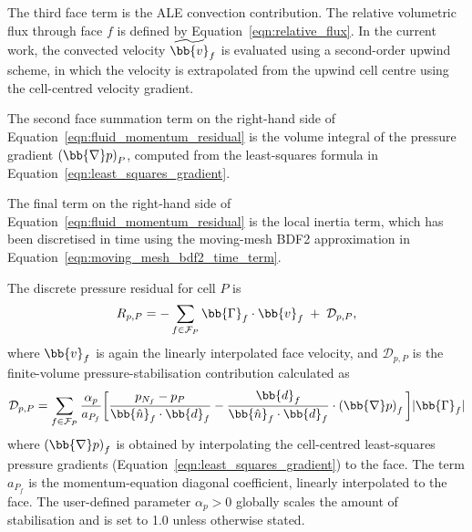 The third face term is the ALE convection contribution. The relative volumetric flux
through face $f$ is defined by Equation~\eqref{eqn:relative_flux}.
In the current work, the convected velocity $\widetilde{\bb{v}}_f$ is evaluated using a second-order upwind scheme, in which the velocity is extrapolated from the upwind cell centre using the cell-centred velocity gradient.

The second face summation term on the right-hand side of Equation~\eqref{eqn:fluid_momentum_residual} is the volume integral of the pressure gradient $\left( \bb{\nabla} p \right)_P$, computed from the least-squares formula in Equation~\eqref{eqn:least_squares_gradient}.

The final term on the right-hand side of Equation~\eqref{eqn:fluid_momentum_residual} is the local inertia term, which has been discretised in time using the moving-mesh BDF2 approximation in Equation~\eqref{eqn:moving_mesh_bdf2_time_term}.

The discrete pressure residual for cell $P$ is
\begin{equation}
    R_{p,P}
    =
    -
    \sum_{f \in \mathcal{F}_P}
    \bb{\Gamma}_f \cdot \bb{v}_f
    \;+\;
    \mathcal{D}_{p,P},
    \label{qm:eqn:fluid_pressure_residual}
\end{equation}
where $\bb{v}_f$ is again the linearly interpolated face velocity, and $\mathcal{D}_{p,P}$ is the finite-volume pressure-stabilisation contribution \citep{Rhie1983} calculated as
\begin{eqnarray} \label{qm:eqn:rhie_chow}
	\mathcal{D}_{p,P}
	=
	\sum_{f \in \mathcal{F}_P}
	\frac{\alpha_p}{a_{P_f}}
        \bigg[
	\frac{p_{N_f} - p_{P}}{\bb{\hat{n}}_f \cdot \bb{d}_f}
       -
       \frac{\bb{d}_f}{\bb{\hat{n}}_f \cdot \bb{d}_f} \cdot \left( \bb{\nabla} p \right)_f
    \bigg]
    |\bb{\Gamma}_f|
\end{eqnarray}
where $\left( \bb{\nabla} p \right)_f$ is obtained by interpolating the cell-centred least-squares pressure gradients (Equation~\eqref{eqn:least_squares_gradient}) to the face.
The term $a_{P_f}$ is the momentum-equation diagonal coefficient, linearly interpolated to the face.
The user-defined parameter $\alpha_p > 0$ globally scales the amount of stabilisation and is set to 1.0 unless otherwise stated.

